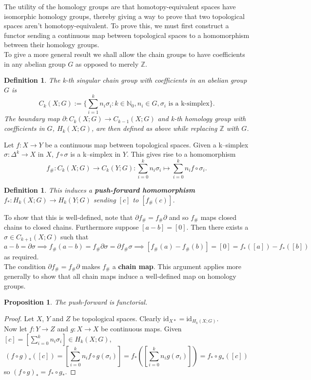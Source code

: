 \documentclass{article}
\newtheorem{definition}[theorem]{Definition}
\newtheorem{proposition}[theorem]{Proposition}
\begin{document}
\noindent The utility of the homology groups are that homotopy-equivalent spaces have isomorphic homology groups, thereby giving a way to prove that two topological spaces aren't homotopy-equivalent. To prove this, we must first construct a functor sending a continuous map between topological spaces to a homomorphism between their homology groups.\\

\noindent To give a more general result we shall allow the chain groups to have coefficients in any abelian group $G$ as opposed to merely $\mathbb{Z}$.
\begin{definition}
The k-th singular chain group with coefficients in an abelian group $G$ is \[C_k(X;G):=\{\sum_{i=1}^kn_i\sigma_i:k\in\mathbb{N}_0,n_i\in G,\sigma_i \text{ is a k-simplex}\}.\] The boundary map $\partial\colon C_k(X;G)\to C_{k-1}(X;G)$ and k-th homology group with coefficients in $G$, $H_k(X;G)$, are then defined as above while replacing $\mathbb{Z}$ with $G$.
\end{definition}

\noindent Let $f\colon X\to Y$ be a continuous map between topological spaces. Given a k--simplex $\sigma\colon\Delta^k\to X$ in $X$, $f\circ\sigma$ is a k--simplex in $Y$. This gives rise to a homomorphism \[f_\#\colon C_k(X;G)\to C_k(Y;G):\sum_{i=0}^kn_i\sigma_i\mapsto\sum_{i=0}^kn_if\circ\sigma_i.\]
\begin{definition}
This induces a \textbf{push-forward homomorphism} $f_*\colon H_k(X;G)\to H_k(Y;G)$ sending $[c]$ to $[f_\#(c)]$.
\end{definition}
\noindent To show that this is well-defined, note that $\partial f_\#=f_\#\partial$ and so $f_\#$ maps closed chains to closed chains. Furthermore suppose $[a-b]=[0]$. Then there exists a $\sigma\in C_{k+1}(X;G)$ such that \[a-b=\partial\sigma\implies f_\#(a-b)=f_\#\partial\sigma=\partial f_\#\sigma\implies [f_\#(a)-f_\#(b)]=[0]=f_*([a])-f_*([b])\] as required.\\

\noindent The condition $\partial f_\#=f_\#\partial$ makes $f_\#$ a \textbf{chain map}. This argument applies more generally to show that all chain maps induce a well-defined map on homology groups.

\begin{proposition}
The push-forward is functorial.
\end{proposition}
\begin{proof}
Let $X$, $Y$ and $Z$ be topological spaces.
Clearly $\text{id}_{X*}=\text{id}_{H_k(X;G)}$.\\
Now let $f\colon Y\to Z$ and $g\colon X\to X$ be continuous maps. Given $[c]=[\sum_{i=0}^kn_i\sigma_i]\in H_k(X;G)$, \[(f\circ g)_*([c])=[\sum_{i=0}^kn_if\circ g(\sigma_i)]=f_*([\sum_{i=0}^kn_ig(\sigma_i)])=f_*\circ g_*([c])\] so $(f\circ g)_*=f_*\circ g_*$.
\end{proof}
\end{document}
